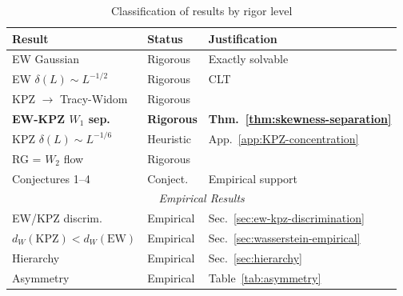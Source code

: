 \documentclass[aps,pre,reprint,amsmath,amssymb,superscriptaddress]{revtex4-2}
\newcommand{\EW}{\text{EW}}
\newcommand{\KPZ}{\text{KPZ}}
\begin{document}
\begin{table}[h]
\centering
\caption{Classification of results by rigor level}
\footnotesize
\begin{tabular}{@{}lll@{}}
\toprule
Result & Status & Justification \\
\midrule
EW Gaussian & Rigorous & Exactly solvable \\
EW $\delta(L)\sim L^{-1/2}$ & Rigorous & CLT \\
KPZ $\to$ Tracy-Widom & Rigorous & \cite{CorwinQuastel2013,SasamotoSpohn2010} \\
\textbf{EW-KPZ $W_1$ sep.} & \textbf{Rigorous} & \textbf{Thm.~\ref{thm:skewness-separation}} \\
KPZ $\delta(L)\sim L^{-1/6}$ & Heuristic & App.~\ref{app:KPZ-concentration} \\
RG = $W_2$ flow & Rigorous & \cite{CotlerRezchikov2023} \\
Conjectures 1--4 & Conject. & Empirical support \\
\midrule
\multicolumn{3}{c}{\textit{Empirical Results}} \\
\midrule
EW/KPZ discrim. & Empirical & Sec.~\ref{sec:ew-kpz-discrimination} \\
$d_W(\KPZ)<d_W(\EW)$ & Empirical & Sec.~\ref{sec:wasserstein-empirical} \\
Hierarchy & Empirical & Sec.~\ref{sec:hierarchy} \\
Asymmetry & Empirical & Table~\ref{tab:asymmetry} \\
\bottomrule
\end{tabular}
\end{table}



\end{document}

